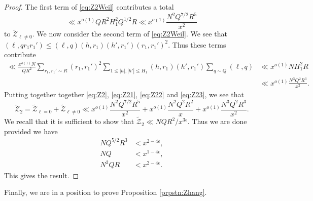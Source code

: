 \documentclass[10pt]{amsart}
\theoremstyle{plain}
\numberwithin{equation}{section}
\begin{document}
\begin{proof}
The first term of \eqref{eq:Z2Weil} contributes a total
\begin{equation}
\ll x^{o(1)} Q R^2 H_1^2 Q^{1/2} R \ll x^{o(1)}\frac{N^2 Q^{7/2} R^5}{x^2}\label{eq:Z22}
\end{equation}
to $\widetilde{\mathscr{Z}}_{\ell\ne 0}$. We now consider the second term of \eqref{eq:Z2Weil}. We see that $(\ell,q r_1 r_1')\le (\ell,q)(h,r_1)(h',r_1')(r_1,r_1')^2$. Thus these terms contribute
\begin{align}
\ll \frac{x^{o(1)} N}{Q R^2}\sum_{r_1,r_1'\sim R}(r_1,r_1')^2\sum_{1\le |h|,|h'|\le H_1}(h,r_1)(h',r_1')\sum_{q\sim Q}(\ell,q)
&\ll x^{o(1)}N H_1^2 R \nonumber \\
&\ll x^{o(1)}\frac{N^3 Q^2 R^3}{x^2}.
\label{eq:Z23}
\end{align}
%
%
Putting together together \eqref{eq:Z2}, \eqref{eq:Z21}, \eqref{eq:Z22} and \eqref{eq:Z23}, we see that
\[
\widetilde{\mathscr{Z}}_2=\widetilde{\mathscr{Z}}_{\ell=0}+\widetilde{\mathscr{Z}}_{\ell\ne 0}\ll x^{o(1)}\frac{N^2 Q^{7/2}R^5}{x^2}+x^{o(1)} \frac{N^2 Q^2 R^2}{x}+x^{o(1)}\frac{N^3 Q^2 R^3}{x^2}.
\]
We recall that it is sufficient to show that $\widetilde{\mathscr{Z}}_2\ll N Q R^2/x^{3\epsilon}$. Thus we are done provided we have
\begin{align}
N Q^{5/2}R^3 &< x^{2-4\epsilon},\\
N Q&<x^{1-4\epsilon}, \\
N^2 Q R&<x^{2-4\epsilon}.
\end{align} 
This gives the result.
\end{proof}
%
%
%
%
%
%
%
%
Finally, we are in a position to prove Proposition \ref{prpstn:Zhang}.
%
%
%
%
%
%
%
%
\end{document}
